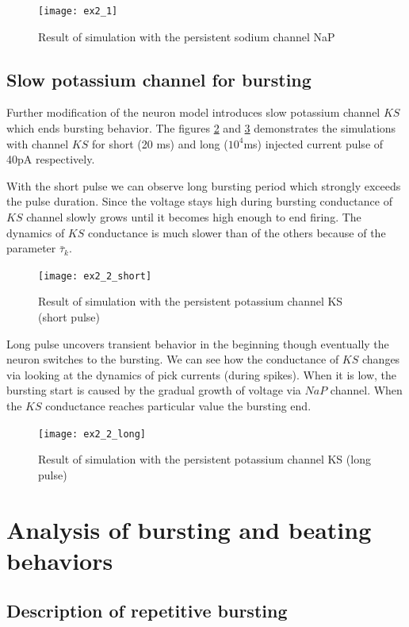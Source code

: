 \documentclass[a4paper,11pt]{article} %
\begin{document}
\begin{figure}[H]
    \centering
    \texttt{[image: ex2\_1]}
    \caption{Result of simulation with the persistent sodium channel NaP}
    \label{fig:2.1}
\end{figure}

\subsection{Slow potassium channel for bursting}

Further modification of the neuron model introduces slow potassium channel $KS$
which ends bursting behavior. The figures \ref{fig:short} and \ref{fig:long}
demonstrates the simulations with channel $KS$ for short (20 ms) and long ($10^4$ms) injected
current pulse of 40pA respectively.

With the short pulse we can observe long bursting period
which strongly exceeds the pulse duration. Since the voltage stays high during bursting
conductance of $KS$ channel slowly grows until it becomes high enough to end firing.
The dynamics of $KS$ conductance is much slower than of the others because of the parameter $\bar{\tau}_k$.

\begin{figure}[H]
    \centering
    \texttt{[image: ex2\_2\_short]}
    \caption{Result of simulation with the persistent potassium channel KS (short pulse)}
    \label{fig:short}
\end{figure}

Long pulse uncovers transient behavior in the beginning though eventually the neuron
switches to the bursting. We can see how the conductance of $KS$ changes via looking
at the dynamics of pick currents (during spikes). When it is low, the bursting start
is caused by the gradual growth of voltage via $NaP$ channel. When the $KS$ conductance
reaches particular value the bursting end.

\begin{figure}[H]
    \centering
    \texttt{[image: ex2\_2\_long]}
    \caption{Result of simulation with the persistent potassium channel KS (long pulse)}
    \label{fig:long}
\end{figure}

\section{Analysis of bursting and beating behaviors}
\subsection{Description of repetitive bursting}
\end{document}
